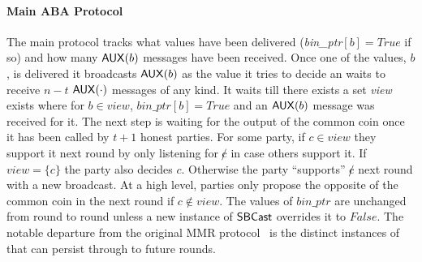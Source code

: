 \paragraph{Main ABA Protocol}
The main protocol tracks what values have been delivered (\emph{bin\_ptr}$[b]=
True$ if so) and how many ${\mathsf {AUX}}(b)$ messages have been received.  Once one
of the values, $b$, is delivered it broadcasts ${\mathsf {AUX}}(b)$ as the value it
tries to decide an waits to receive $n-t$ ${\mathsf {AUX}}(\cdot)$ messages of any
kind.  It waits till there exists a set \emph{view} exists where for $b \in
view$, $bin\_ptr[b] = True$ and an ${\mathsf {AUX}}(b)$ message was received for it.
The next step is waiting for the output of the common coin once it has been
called by $t+1$ honest parties.  For some party, if $c \in view$ they support
it next round by only listening for $\not c$ in case others support it. If
$view = \{c\}$ the party also decides $c$.  Otherwise the party ``supports''
$\not c$ next round with a new broadcast.  At a high level, parties only
propose the opposite of the common coin in the next round if $c \notin view$.
The values of $bin\_ptr$ are unchanged from round to round unless a new
instance of ${\mathsf {SBCast}}$ overrides it to $False$.  The notable departure from
the original MMR protocol~\cite{oldmmr} is the distinct instances of
 that can persist through to future rounds.


